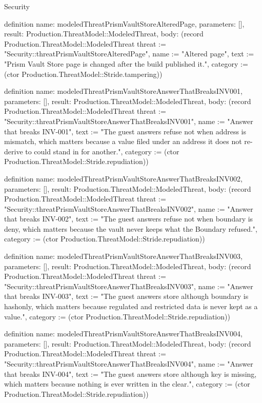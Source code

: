 \begin{lexlean}{Security}
\begin{semanticmodule}
definition{
  name: modeledThreatPrismVaultStoreAlteredPage,
  parameters: [],
  result: Production.ThreatModel::ModeledThreat,
  body: (record Production.ThreatModel::ModeledThreat {threat := "Security::threatPrismVaultStoreAlteredPage", name := "Altered page", text := "Prism Vault Store page is changed after the build published it.", category := (ctor Production.ThreatModel::Stride.tampering)})
}

definition{
  name: modeledThreatPrismVaultStoreAnswerThatBreaksINV001,
  parameters: [],
  result: Production.ThreatModel::ModeledThreat,
  body: (record Production.ThreatModel::ModeledThreat {threat := "Security::threatPrismVaultStoreAnswerThatBreaksINV001", name := "Answer that breaks INV-001", text := "The guest answers refuse not when address is mismatch, which matters because a value filed under an address it does not re-derive to could stand in for another.", category := (ctor Production.ThreatModel::Stride.repudiation)})
}

definition{
  name: modeledThreatPrismVaultStoreAnswerThatBreaksINV002,
  parameters: [],
  result: Production.ThreatModel::ModeledThreat,
  body: (record Production.ThreatModel::ModeledThreat {threat := "Security::threatPrismVaultStoreAnswerThatBreaksINV002", name := "Answer that breaks INV-002", text := "The guest answers refuse not when boundary is deny, which matters because the vault never keeps what the Boundary refused.", category := (ctor Production.ThreatModel::Stride.repudiation)})
}

definition{
  name: modeledThreatPrismVaultStoreAnswerThatBreaksINV003,
  parameters: [],
  result: Production.ThreatModel::ModeledThreat,
  body: (record Production.ThreatModel::ModeledThreat {threat := "Security::threatPrismVaultStoreAnswerThatBreaksINV003", name := "Answer that breaks INV-003", text := "The guest answers store although boundary is hashonly, which matters because regulated and restricted data is never kept as a value.", category := (ctor Production.ThreatModel::Stride.repudiation)})
}

definition{
  name: modeledThreatPrismVaultStoreAnswerThatBreaksINV004,
  parameters: [],
  result: Production.ThreatModel::ModeledThreat,
  body: (record Production.ThreatModel::ModeledThreat {threat := "Security::threatPrismVaultStoreAnswerThatBreaksINV004", name := "Answer that breaks INV-004", text := "The guest answers store although key is missing, which matters because nothing is ever written in the clear.", category := (ctor Production.ThreatModel::Stride.repudiation)})
}


\end{semanticmodule}
\end{lexlean}
